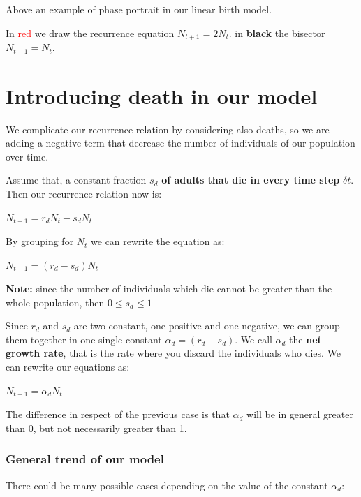 \begin{center}
    Above an example of phase portrait in our linear birth model. 
    \par In \textcolor{red}{red} we draw the recurrence equation $N_{t+1} = 2N_{t}$.
    in \textbf{black} the bisector $N_{t+1} = N_{t}$. 
\end{center}

\section{Introducing death in our model}
We complicate our recurrence relation by considering also deaths, so we are adding a negative term that decrease the number of individuals of our population over time. 
\par Assume that, a constant fraction $s_{d}$ \textbf{of adults that die in every time step} $\delta{t}$. Then our recurrence relation now is:
\begin{center}
    $N_{t+1} = r_{d}N_{t} - s_{d}N_{t}$
\end{center}

By grouping for $N_t$ we can rewrite the equation as:

\begin{center}
    $N_{t+1} = (r_{d} - s_{d})N_{t}$
\end{center}

\textbf{Note:} since the number of individuals which die cannot be greater than the whole population, then $ 0 \leq s_{d} \leq 1$

\par Since $r_{d}$ and $s_{d}$ are two constant, one positive and one negative, we can group them together in one single constant $\alpha_{d} = (r_{d} - s_{d})$. We call $\alpha_{d}$ the \textbf{net growth rate}, that is the rate where you discard the individuals who dies. We can rewrite our equations as:

\begin{center}
    $N_{t+1} = \alpha_{d}N_{t}$
\end{center}

The difference in respect of the previous case is that $\alpha_{d}$ will be in general greater than 0, but not necessarily greater than 1.

\subsubsection{General trend of our model}
There could be many possible cases depending on the value of the constant $\alpha_{d}$:

